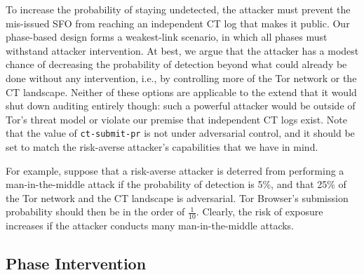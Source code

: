 To increase the probability of staying undetected, the attacker must prevent the
mis-issued SFO from reaching an independent CT log that makes it public.  Our
phase-based design forms a weakest-link scenario, in which all phases must
withstand attacker intervention.  At best, we argue that the attacker has a
modest chance of decreasing the probability of detection beyond what could
already be done without any intervention, i.e., by controlling more of the Tor
network or the CT landscape.  Neither of these options are applicable to the
extend that it would shut down auditing entirely though:
	such a powerful attacker would be outside of Tor's threat model or
	violate our premise that independent CT logs exist.
Note that the value of \texttt{ct-submit-pr} is not under adversarial control,
and it should be set to match the risk-averse attacker's capabilities that we
have in mind.

For example, suppose that a risk-averse attacker is deterred from performing a
man-in-the-middle attack if the probability of detection is 5\%, and that
25\% of the Tor network and the CT landscape is adversarial.  Tor Browser's
submission probability should then be in the order of $\frac{1}{10}$.  Clearly,
the risk of exposure increases if the attacker conducts many man-in-the-middle
attacks.

\subsection{Phase Intervention}
